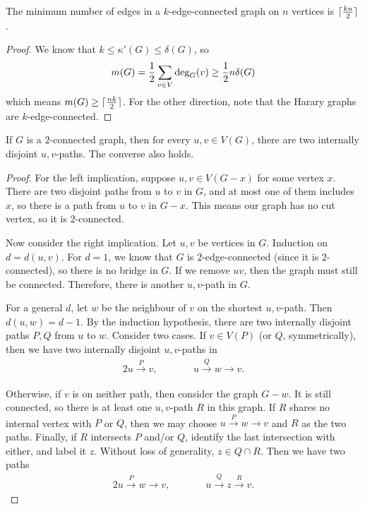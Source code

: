 
\begin{corollary}
  The minimum number of edges in a $k$-edge-connected graph on $n$ vertices is
  $\lceil \frac{kn}{2} \rceil$.
\end{corollary}

\begin{proof}
  We know that $k \le \kappa'(G) \le \delta(G)$, so
  \[
	m(G) = \frac{1}{2} \sum_{v \in V} \deg_G(v) \ge \frac{1}{2} n \delta(G)
  \]
  which means $m(G) \ge \lceil \frac{nk}{2} \rceil$.
  For the other direction, note that the Harary graphs are $k$-edge-connected.
\end{proof}

\begin{theorem}[Whitney]
  If $G$ is a $2$-connected graph, then for every $u, v \in V(G)$, there are two
  internally disjoint $u,v$-paths.
  The converse also holds.
\end{theorem}

\begin{proof}
  For the left implication, suppose $u, v \in V(G - x)$ for some vertex $x$.
  There are two disjoint paths from $u$ to $v$ in $G$, and at most one of them
  includes $x$, so there is a path from $u$ to $v$ in $G - x$.
  This means our graph has no cut vertex, so it is $2$-connected.

  Now consider the right implication.
  Let $u, v$ be vertices in $G$.
  Induction on $d = d(u,v)$.
  For $d = 1$, we know that $G$ is $2$-edge-connected (since it is
  $2$-connected), so there is no bridge in $G$.
  If we remove $uv$, then the graph must still be connected.
  Therefore, there is another $u,v$-path in $G$.

  For a general $d$, let $w$ be the neighbour of $v$ on the shortest $u,v$-path.
  Then $d(u,w) = d-1$.
  By the induction hypothesis, there are two internally disjoint paths $P, Q$
  from $u$ to $w$.
  Consider two cases.
  If $v \in V(P)$ (or $Q$, symmetrically), then we have two internally disjoint
  $u,v$-paths in
  \begin{alignat*}{2}
	u \xrightarrow{P} v,
	& \qquad &
			   u \xrightarrow{Q} w \to v.
  \end{alignat*}

  Otherwise, if $v$ is on neither path, then consider the graph $G - w$.
  It is still connected, so there is at least one $u,v$-path $R$ in this graph.
  If $R$ shares no internal vertex with $P$ or $Q$, then we may choose $u
  \xrightarrow{P} w \to v$ and $R$ as the two paths.
  Finally, if $R$ intersects $P$ and/or $Q$, identify the last intersection with
  either, and label it $z$.
  Without loss of generality, $z \in Q \cap R$.
  Then we have two paths
  \begin{alignat*}{2}
	u \xrightarrow{P} w \to v,
	& \qquad &
			   u \xrightarrow{Q} z \xrightarrow{R} v.
  \end{alignat*}
\end{proof}


